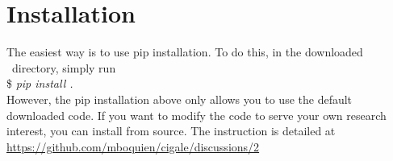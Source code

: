 \section{Installation}\label{sec:install}
The easiest way is to use pip installation.
To do this, in the downloaded \xcig\ directory,
simply run \\
\$ \textit{pip install .} \\

However, the pip installation above only allows you to use the default downloaded code. 
If you want to modify the code to serve your own research interest, you can install from source. 
The instruction is detailed at \url{https://github.com/mboquien/cigale/discussions/2}



